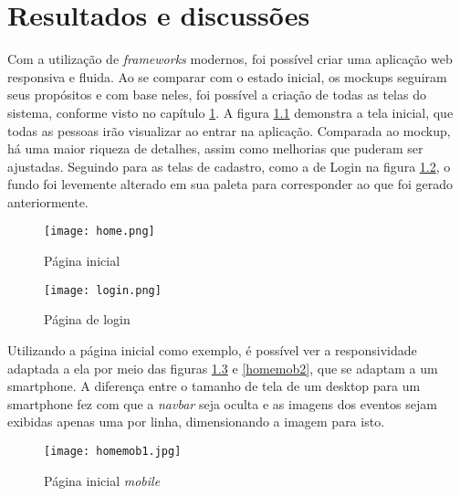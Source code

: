 \chapter{Resultados e discussões}\label{chp:LABEL_CHP_5}
\label{resultados}
Com a utilização de \textit{frameworks} modernos, foi possível criar uma aplicação web responsiva e fluida. Ao se comparar com o estado inicial, os mockups seguiram seus propósitos e com base neles, foi possível a criação de todas as telas do sistema, conforme visto no capítulo \ref{chp:LABEL_CHP_5}. A figura \ref{home} demonstra a tela inicial, que todas as pessoas irão visualizar ao entrar na aplicação. Comparada ao mockup, há uma maior riqueza de detalhes, assim como melhorias que puderam ser ajustadas. Seguindo para as telas de cadastro, como a de Login na figura \ref{login}, o fundo foi levemente alterado em sua paleta para corresponder ao que foi gerado anteriormente. 

\begin{figure}[H]
    \caption{\label{home}Página inicial}
    \vspace{5pt}
    \centering
    \texttt{[image: home.png]}
    \vspace{5pt}
\end{figure}
\begin{figure}[H]
    \caption{\label{login}Página de login}
    \vspace{5pt}
    \centering
    \texttt{[image: login.png]}
    \vspace{5pt}
\end{figure}

Utilizando a página inicial como exemplo, é possível ver a responsividade adaptada a ela por meio das figuras \ref{homemob1} e \ref{homemob2}, que se adaptam a um smartphone. A diferença entre o tamanho de tela de um desktop para um smartphone fez com que a \textit{navbar} seja oculta e as imagens dos eventos sejam exibidas apenas uma por linha, dimensionando a imagem para isto.

\begin{figure}[H]
    \caption{\label{homemob1}Página inicial \textit{mobile}}
    \vspace{5pt}
    \centering
    \texttt{[image: homemob1.jpg]}
    \vspace{5pt}
\end{figure}


